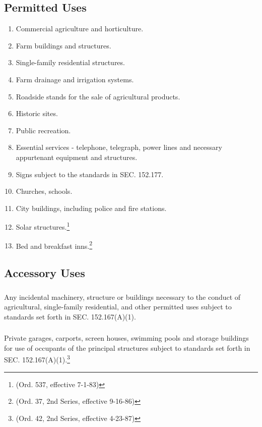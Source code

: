 \subsection{Permitted Uses}
\begin{enumerate}[{\indent}1)]
    \item Commercial agriculture and horticulture.
    \item Farm buildings and structures.
    \item Single-family residential structures.
    \item Farm drainage and irrigation systems.
    \item Roadside stands for the sale of agricultural products.
    \item Historic sites.
    \item Public recreation.
    \item Essential services - telephone, telegraph, power lines and necessary appurtenant equipment and structures.
    \item Signs subject to the standards in SEC. 152.177.
    \item Churches, schools.
    \item City buildings, including police and fire stations.
    \item Solar structures.\footnote{(Ord. 537, effective 7-1-83)}
    \item Bed and breakfast inns.\footnote{(Ord. 37, 2nd Series, effective 9-16-86)}
\end{enumerate}
\subsection{Accessory Uses}
\subsubsection{}
Any incidental machinery, structure or buildings necessary to the conduct of agricultural, single-family residential, and other permitted uses subject to standards set forth in SEC. 152.167(A)(1).
\subsubsection{}
Private garages, carports, screen houses, swimming pools and storage buildings for use of occupants of the principal structures subject to standards set forth in SEC. 152.167(A)(1).\footnote{(Ord. 42, 2nd Series, effective 4-23-87)}
